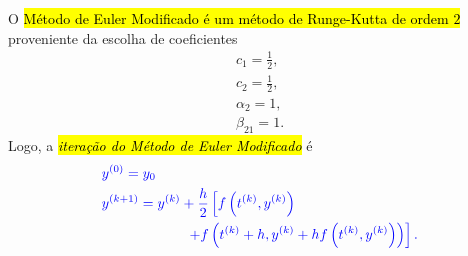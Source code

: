 O \hl{Método de Euler Modificado é um método de Runge-Kutta de ordem $2$} proveniente da escolha de coeficientes
\begin{equation}
  \begin{aligned}
    c_1 = \frac{1}{2}, \\
    c_2 = \frac{1}{2}, \\
    \alpha_2 = 1,\\
    \beta_{21}=1.
\end{aligned}
\end{equation}
Logo, a \hl{\emph{iteração do Método de Euler Modificado}} é
\begin{equation}\color{blue}\begin{aligned}
    &y^{(0)} = y_0\\
    &y^{(k+1)} = y^{(k)} + \frac{h}{2}\left[f\left(t^{(k)},y^{(k)}\right) \right.\\
    &\qquad\qquad\qquad\left. + f\left(t^{(k)}+h, y^{(k)}+hf\left(t^{(k)},y^{(k)}\right)\right)\right].
  \end{aligned}
\end{equation}
